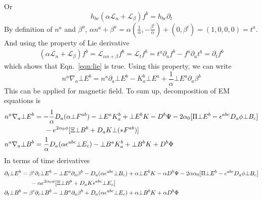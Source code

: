 \documentclass[prd]{revtex4}
\begin{document}
Or
\begin{equation}
h_{bc} (\alpha \mathcal{L}_n + \mathcal{L}_\beta) f^b = h_{bc} \partial_t
\end{equation}
By definition of $n^a$ and $\beta^a$, $\alpha n^a + \beta^a = \alpha \left( \frac{1}{\alpha}, - \frac{\beta^i}{\alpha} \right) + (0, \beta^i) = (1,0,0,0) = t^a$. And using the property of Lie derivative
\begin{align}
(\alpha \mathcal{L}_n + \mathcal{L}_\beta) f^b = \mathcal{L}_{\alpha n + \beta} f^b = \mathcal{L}_t f^b = t^a \partial_a f^b - f^a \partial_a t^b = \partial_t f^b
\end{align}
which shows that Eqn.~\ref{eqn:lie} is true. Using this property, we can write 
\begin{equation}
n^a \nabla_a \bot E^b = n^a \partial_a \bot E^b - K^b_a \bot E^a +\frac{1}{\alpha} \bot E^a \partial_a \beta^b
\end{equation}
This can be applied for magnetic field. To sum up, decomposition of EM equations is
\begin{align}
n^a \nabla_a \bot E^b &= -\frac{1}{\alpha} D_a (\alpha \bot F^{ab}) - \bot E^a K_a^b + \bot E^b K - D^b \Psi - 2 \alpha_0 [ \Pi \bot E^b - \epsilon^{abc} D_a \phi \bot B_c ] \nonumber \\
				  &\indent - e^{2 \alpha_0 \phi} [ \Xi  \bot B^b + D_a K \bot (\ast F^{ab})] \\
n^a \nabla_a \bot B^b &= \frac{1}{\alpha} D_a (\alpha \epsilon^{abc} \bot E_c ) - \bot B^a K_a^b + \bot B^b K + D^b \Phi
\end{align}
In terms of time derivatives
\begin{align}
\partial_t \bot E^b &= \beta^i \partial_i \bot E^b -\bot E^a \partial_a \beta^b -D_a (\alpha \epsilon^{abc} \bot B_c ) + \alpha \bot E^b K - \alpha D^b \Psi - 2 \alpha \alpha_0 [ \Pi \bot E^b - \epsilon^{abc} D_a \phi \bot B_c ] \nonumber \\
				  &\indent - \alpha e^{2 \alpha_0 \phi} [ \Xi \bot B^b + D_a K \epsilon^{abc} \bot E_c] \\
\partial_t \bot B^b &= \beta^i \partial_i \bot B^b- \bot B^a \partial_a \beta^b + D_a (\alpha \epsilon^{abc} \bot E_c ) + \alpha \bot B^b K + \alpha D^b \Phi
\end{align}
\end{document}

